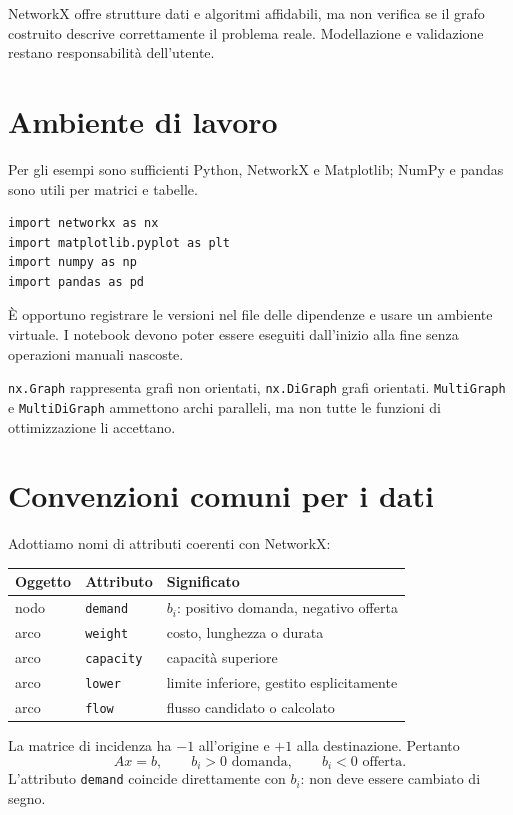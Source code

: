 \documentclass[11pt,a4paper]{article}
\begin{document}
NetworkX offre strutture dati e algoritmi affidabili, ma non verifica se il grafo costruito descrive correttamente il problema reale. Modellazione e validazione restano responsabilità dell'utente.

\section{Ambiente di lavoro}
Per gli esempi sono sufficienti Python, NetworkX e Matplotlib; NumPy e pandas sono utili per matrici e tabelle.
\begin{lstlisting}[style=python,caption={Importazioni comuni}]
import networkx as nx
import matplotlib.pyplot as plt
import numpy as np
import pandas as pd
\end{lstlisting}

È opportuno registrare le versioni nel file delle dipendenze e usare un ambiente virtuale. I notebook devono poter essere eseguiti dall'inizio alla fine senza operazioni manuali nascoste.

\begin{networkxbox}
\texttt{nx.Graph} rappresenta grafi non orientati, \texttt{nx.DiGraph} grafi orientati. \texttt{MultiGraph} e \texttt{MultiDiGraph} ammettono archi paralleli, ma non tutte le funzioni di ottimizzazione li accettano.
\end{networkxbox}

\section{Convenzioni comuni per i dati}
Adottiamo nomi di attributi coerenti con NetworkX:
\begin{center}\begin{tabular}{lll}\toprule
Oggetto&Attributo&Significato\\\midrule
nodo&\texttt{demand}&$b_i$: positivo domanda, negativo offerta\\
arco&\texttt{weight}&costo, lunghezza o durata\\
arco&\texttt{capacity}&capacità superiore\\
arco&\texttt{lower}&limite inferiore, gestito esplicitamente\\
arco&\texttt{flow}&flusso candidato o calcolato\\
\bottomrule\end{tabular}\end{center}

\begin{notationbox}
La matrice di incidenza ha $-1$ all'origine e $+1$ alla destinazione. Pertanto
\[
Ax=b,\qquad b_i>0\text{ domanda},\qquad b_i<0\text{ offerta}.
\]
L'attributo \texttt{demand} coincide direttamente con $b_i$: non deve essere cambiato di segno.
\end{notationbox}
\end{document}
